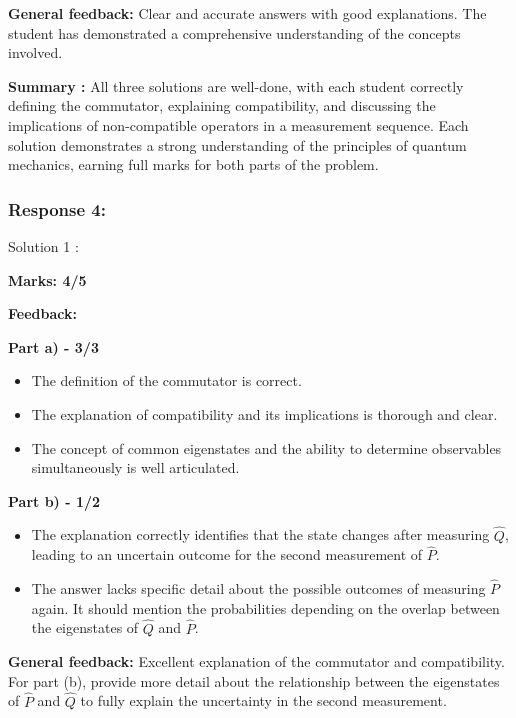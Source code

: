 \documentclass[a4paper,11pt]{article}
\begin{document}
\textbf{General feedback:}
Clear and accurate answers with good explanations. The student has demonstrated a comprehensive understanding of the concepts involved.

\textbf{Summary :}
All three solutions are well-done, with each student correctly defining the commutator, explaining compatibility, and discussing the implications of non-compatible operators in a measurement sequence. Each solution demonstrates a strong understanding of the principles of quantum mechanics, earning full marks for both parts of the problem.


\subsubsection*{Response 4:}

Solution 1 :

\textbf{Marks: 4/5}

\textbf{Feedback:}

\textbf{Part a) - 3/3}

\begin{itemize}
    \item The definition of the commutator is correct.
    \item The explanation of compatibility and its implications is thorough and clear.
    \item The concept of common eigenstates and the ability to determine observables simultaneously is well articulated.
\end{itemize}

\textbf{Part b) - 1/2}

\begin{itemize}
    \item The explanation correctly identifies that the state changes after measuring $\hat{Q}$, leading to an uncertain outcome for the second measurement of $\hat{P}$.
    \item The answer lacks specific detail about the possible outcomes of measuring $\hat{P}$ again. It should mention the probabilities depending on the overlap between the eigenstates of $\hat{Q}$ and $\hat{P}$.
\end{itemize}

\textbf{General feedback:}
Excellent explanation of the commutator and compatibility. For part (b), provide more detail about the relationship between the eigenstates of $\hat{P}$ and $\hat{Q}$ to fully explain the uncertainty in the second measurement.
\end{document}
